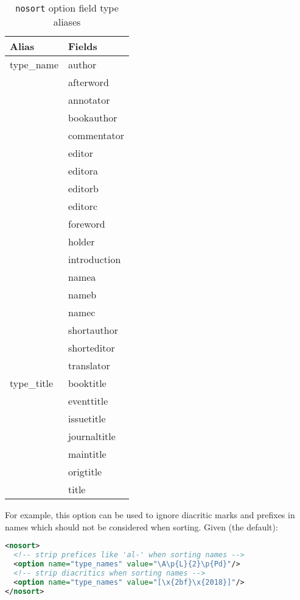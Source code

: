 \documentclass{ltxdockit}
\begin{document}
\begin{table}
\begin{center}
\small
\begin{tabular}{ll}
\toprule
Alias & Fields\\
\midrule
type\_name & author\\
          & afterword\\
          & annotator\\
          & bookauthor\\
          & commentator\\
          & editor\\
          & editora\\
          & editorb\\
          & editorc\\
          & foreword\\
          & holder\\
          & introduction\\
          & namea\\
          & nameb\\
          & namec\\
          & shortauthor\\
          & shorteditor\\
          & translator\\
type\_title & booktitle\\
           & eventtitle\\
           & issuetitle\\
           & journaltitle\\
           & maintitle\\
           & origtitle\\
           & title\\
\bottomrule
\end{tabular}
\end{center}
\caption{\texttt{nosort} option field type aliases}
\label{tab:nst}
\end{table}

For example, this option can be used to ignore diacritic marks and prefixes
in names which should not be considered when sorting. Given (the default):

\begin{lstlisting}[language=xml]
<nosort>
  <!-- strip prefices like 'al-' when sorting names -->
  <option name="type_names" value="\A\p{L}{2}\p{Pd}"/>
  <!-- strip diacritics when sorting names -->
  <option name="type_names" value="[\x{2bf}\x{2018}]"/>
</nosort>
\end{lstlisting}
\end{document}
